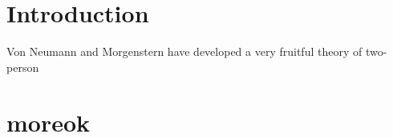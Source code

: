 \section{Introduction}
Von Neumann and Morgenstern have developed a very fruitful theory of two-person
\section{moreok}
